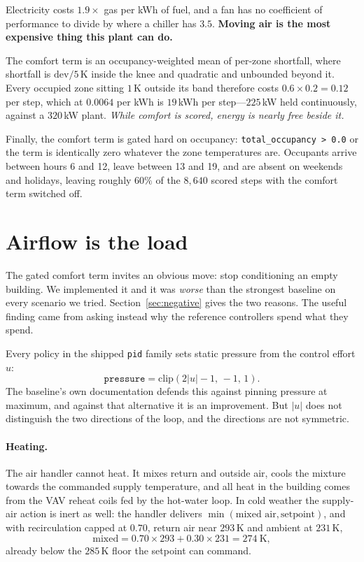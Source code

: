 \documentclass[10pt]{article}
\begin{document}
Electricity costs $1.9\times$ gas per kWh of fuel, and a fan has no coefficient
of performance to divide by where a chiller has $3.5$. \textbf{Moving air is the
most expensive thing this plant can do.}

The comfort term is an occupancy-weighted mean of per-zone shortfall, where
shortfall is $\mathrm{dev}/5\,\mathrm{K}$ inside the knee and quadratic and
unbounded beyond it. Every occupied zone sitting $1$\,K outside its band
therefore costs $0.6 \times 0.2 = 0.12$ per step, which at $0.0064$ per kWh is
$19$\,kWh per step---$225$\,kW held continuously, against a $320$\,kW plant.
\emph{While comfort is scored, energy is nearly free beside it.}

Finally, the comfort term is gated hard on occupancy:
\verb|total_occupancy > 0.0| or the term is identically zero whatever the zone
temperatures are. Occupants arrive between hours 6 and 12, leave between 13 and
19, and are absent on weekends and holidays, leaving roughly $60\%$ of the
$8{,}640$ scored steps with the comfort term switched off.

\section{Airflow is the load}

The gated comfort term invites an obvious move: stop conditioning an empty
building. We implemented it and it was \emph{worse} than the strongest baseline
on every scenario we tried. Section~\ref{sec:negative} gives the two reasons.
The useful finding came from asking instead why the reference controllers spend
what they spend.

Every policy in the shipped \texttt{pid} family sets static pressure from the
control effort $u$:
\begin{equation}
\texttt{pressure} = \mathrm{clip}(2|u| - 1,\,-1,\,1).
\label{eq:pid}
\end{equation}
The baseline's own documentation defends this against pinning pressure at
maximum, and against that alternative it is an improvement. But $|u|$ does not
distinguish the two directions of the loop, and the directions are not
symmetric.

\paragraph{Heating.} The air handler cannot heat. It mixes return and outside
air, cools the mixture towards the commanded supply temperature, and all heat
in the building comes from the VAV reheat coils fed by the hot-water loop. In
cold weather the supply-air action is inert as well: the handler delivers
$\min(\text{mixed air}, \text{setpoint})$, and with recirculation capped at
$0.70$, return air near $293$\,K and ambient at $231$\,K,
\begin{equation}
\text{mixed} = 0.70 \times 293 + 0.30 \times 231 = 274\ \mathrm{K},
\end{equation}
already below the $285$\,K floor the setpoint can command.
\end{document}
